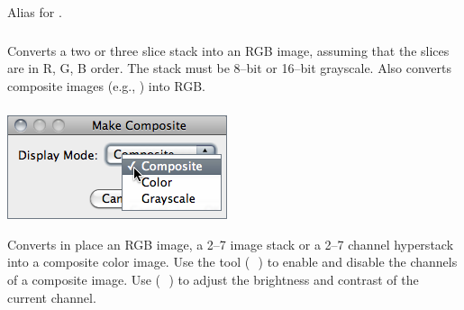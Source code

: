 Alias for .


\subsubsection{\protect{}\label{sub:Stack to RGB}}

Converts a two or three slice stack into an RGB image, assuming that
the slices are in R, G, B order. The stack must be 8--bit or 16--bit
grayscale. Also converts composite images (e.g., )
into RGB.


\subsubsection{\protect{}\label{sub:Make-Composite}}

\begin{minipage}[c][1\totalheight][t]{0.353\columnwidth}%
\includegraphics[scale=0.55]{images/MakeComposite}%
\end{minipage}%
\begin{minipage}[c][1\totalheight][t]{0.647\columnwidth}%
Converts in place an RGB image, a 2--7 image stack or a 2--7 channel
hyperstack into a composite color image. Use the 
tool (\, \,) to enable and disable
the channels of a composite image. Use 
(\, \,) to adjust the brightness
and contrast of the current channel.%
\end{minipage}


\subsubsection{\protect{}\label{sub:Show LUT}}

